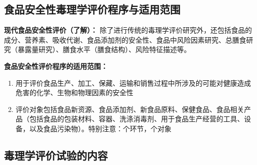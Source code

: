 \subsection{食品安全性毒理学评价程序与适用范围}

\begin{defbox}
\textbf{现代食品安全性评价（了解）：}
除了进行传统的毒理学评价研究外，还包括食品的成分、营养素、吸收代谢、食品添加剂的安全性、食品中风险因素研究、总膳食研究（暴露量研究）、膳食水平（膳食结构）、风险特征描述等。

\textbf{食品安全性评价程序的适用范围：}
\begin{enumerate}[leftmargin=*]
    \item 用于评价食品生产、加工、保藏、运输和销售过程中所涉及的可能对健康造成危害的化学、生物和物理因素的安全性
    \item 评价对象包括食品新资源、食品添加剂、新食品原料、保健食品、食品相关产品（包括食品的包装材料、容器、洗涤消毒剂、用于食品生产经营的工具、设备，以及食品污染物）。特别注意：个环节，个对象
\end{enumerate}
\end{defbox}

\subsection{毒理学评价试验的内容}

